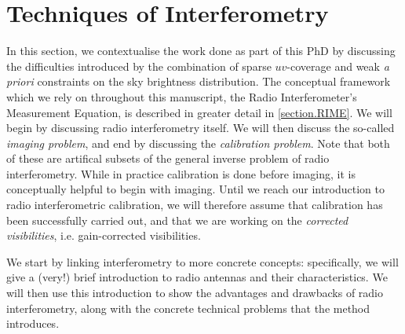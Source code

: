 

\chapter{Techniques of Interferometry}
\minitoc

\pg
In this section, we contextualise the work done as part of this PhD by discussing the difficulties introduced by the combination of sparse $uv$-coverage and weak \emph{a priori} constraints on the sky brightness distribution. The conceptual framework which we rely on throughout this manuscript, the Radio Interferometer's Measurement Equation, is described in greater detail in  \cref{section.RIME}. We will begin by discussing radio interferometry itself. We will then discuss the so-called \emph{imaging problem}, and end by discussing the \emph{calibration problem}. Note that both of these are artifical subsets of the general inverse problem of radio interferometry. While in practice calibration is done before imaging, it is conceptually helpful to begin with imaging. Until we reach our introduction to radio interferometric calibration, we will therefore assume that calibration has been successfully carried out, and that we are working on the \emph{corrected visibilities}, i.e. gain-corrected visibilities. 

\pg
We start by linking interferometry to more concrete concepts: specifically, we will give a (very!) brief introduction to radio antennas and their characteristics. We will then use this introduction to show the advantages and drawbacks of radio interferometry, along with the concrete technical problems that the method introduces.




\clearpage

\clearpage

\clearpage
